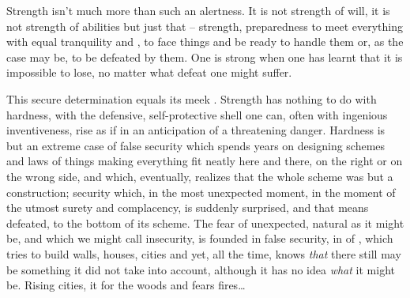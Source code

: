 \label{pa:humbleStrong}
Strength isn't much more than such an  alertness. It is not strength of
will, it is not strength of abilities but just that -- strength, preparedness to
meet everything with equal tranquility and , to face things and be
ready to handle them or, as the case may be, to be defeated by them.
One is strong when one has learnt that it is
impossible to lose, no matter what defeat one might suffer. 

This secure determination equals its meek . Strength has nothing to
do with hardness, with the defensive, self-protective shell one can, often with
ingenious inventiveness, rise as if in an anticipation of a threatening danger.
Hardness is but an extreme case of false security which spends years on
designing schemes and laws of things making everything fit neatly here and
there, on the right or on the wrong side, and which, eventually, realizes that
the whole scheme was but a construction; security which, in the most unexpected
moment, in the moment of the utmost surety and complacency, is suddenly
surprised, and that means defeated, to the bottom of its scheme.  The fear of
unexpected, natural as it might be, and which we might call insecurity, is
founded in false security, in  of \No, which tries to build
walls, houses, cities and yet, all the time, knows {\em that} there still may be
something it did not take into account, although it has no idea {\em what} it
might be.  Rising cities, it  for the woods and fears fires\ldots

